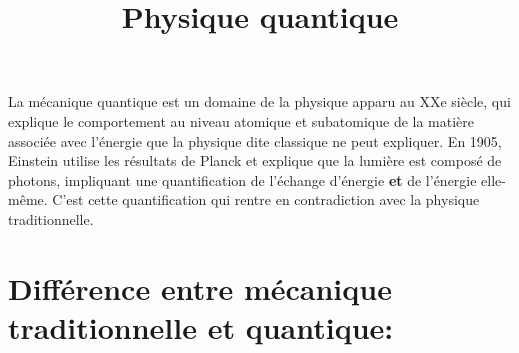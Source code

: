 \documentclass{article}
\author{}
\date{}
\title{Physique quantique}
\begin{document}
\maketitle

La mécanique quantique est un domaine de la physique apparu au XXe siècle, qui explique le comportement au niveau atomique et subatomique de la matière associée avec l'énergie que la physique dite classique ne peut expliquer.\newline
\indent En 1905, Einstein utilise les résultats de Planck et explique que la lumière est composé de photons, impliquant une quantification de l'échange d'énergie \textbf{et} de l'énergie elle-même. C'est cette quantification qui rentre en contradiction avec la physique traditionnelle.

\section{Différence entre mécanique traditionnelle et quantique:}
\end{document}
